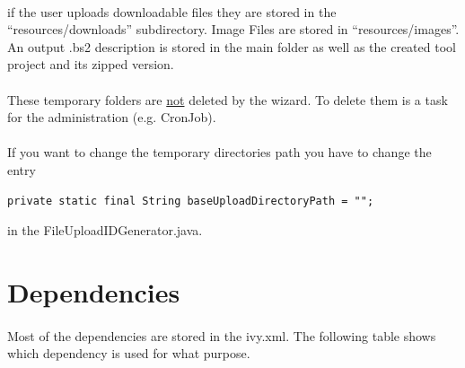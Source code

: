 \documentclass[a4paper,10pt]{book}
\begin{document}
\paragraph{} if the user uploads downloadable files they are stored in the ``resources/downloads'' subdirectory. Image Files are stored in ``resources/images''. An output .bs2 description is stored in the main folder as well as the created tool project and its zipped version.
\paragraph{} These temporary folders are \underline{not} deleted by the wizard. To delete them is a task for the administration (e.g. CronJob).
\paragraph{} If you want to change the temporary directories path you have to change the entry
\begin{verbatim}
private static final String baseUploadDirectoryPath = "";
\end{verbatim}
in the FileUploadIDGenerator.java.

\section{Dependencies}
\label{wizard-dependencies}
\paragraph{} Most of the dependencies are stored in the ivy.xml. The following table shows which dependency is used for what purpose.
\end{document}
